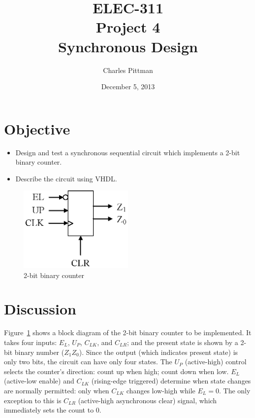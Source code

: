 \documentclass{report}
\author{Charles Pittman}
\title{ELEC-311\\ Project 4\\ Synchronous Design}
\date{December 5, 2013}
\begin{document}
\maketitle %



\section*{Objective}

\begin{itemize}
\item Design and test a synchronous sequential circuit which implements a 2-bit binary counter.
\item Describe the circuit using VHDL.
\end{itemize}

\begin{figure}[hbtp]
  \centering
  \includegraphics[width=0.5\textwidth]{drawing}
  \caption{\label{fig:counter} 2-bit binary counter}
\end{figure}

\section*{Discussion}

Figure~\ref{fig:counter} shows a block diagram of the 2-bit binary counter to be implemented.  It takes four inputs: $E_L$, $U_P$, $C_{LK}$, and $C_{LR}$; and the present state is shown by a 2-bit binary number ($Z_1Z_0$).  Since the output (which indicates present state) is only two bits, the circuit can have only four states.  The $U_P$ (active-high) control selects the counter's direction: count up when high; count down when low.  $E_L$ (active-low enable) and $C_{LK}$ (rising-edge triggered) determine when state changes are normally permitted: only when $C_{LK}$ changes low-high while $E_L=0$.  The only exception to this is $C_{LR}$ (active-high asynchronous clear) signal, which immediately sets the count to 0.
\end{document}

